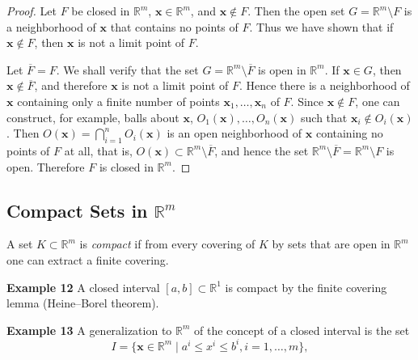 \begin{proof} Let $F$ be closed in $\mathbb{R}^m$, $\mathbf{x} \in \mathbb{R}^m$, and $\mathbf{x} \notin F$. Then the open set $G = \mathbb{R}^m \setminus F$
is a neighborhood of $\mathbf{x}$ that contains no points of $F$. Thus we have shown that if
$\mathbf{x} \notin F$, then $\mathbf{x}$ is not a limit point of $F$.

Let $\overline{F} = F$. We shall verify that the set $G = \mathbb{R}^m \setminus \overline{F}$ is open in $\mathbb{R}^m$. If $\mathbf{x} \in G$, then
$\mathbf{x} \notin \overline{F}$, and therefore $\mathbf{x}$ is not a limit point of $F$. Hence there is a neighborhood of
$\mathbf{x}$ containing only a finite number of points $\mathbf{x}_1, \ldots, \mathbf{x}_n$ of $F$. Since $\mathbf{x} \notin F$, one can
construct, for example, balls about $\mathbf{x}$, $O_1(\mathbf{x}), \ldots, O_n(\mathbf{x})$ such that $\mathbf{x}_i \notin O_i(\mathbf{x})$. Then
$O(\mathbf{x}) = \bigcap_{i=1}^n O_i(\mathbf{x})$ is an open neighborhood of $\mathbf{x}$ containing no points of $F$ at all,
that is, $O(\mathbf{x}) \subset \mathbb{R}^m \setminus \overline{F}$, and hence the set $\mathbb{R}^m \setminus \overline{F} = \mathbb{R}^m \setminus F$ is open. Therefore $F$ is
closed in $\mathbb{R}^m$.
\end{proof}

\subsection{Compact Sets in $\mathbb{R}^m$}
\begin{definition} \label{def:compact} A set $K \subset \mathbb{R}^m$ is \emph{compact} if from every covering of $K$ by sets that are
open in $\mathbb{R}^m$ one can extract a finite covering.
\end{definition}

\textbf{Example 12} A closed interval $[a, b] \subset \mathbb{R}^1$ is compact by the finite covering lemma
(Heine--Borel theorem).

\textbf{Example 13} A generalization to $\mathbb{R}^m$ of the concept of a closed interval is the set
$$
I = \{\mathbf{x} \in \mathbb{R}^m \mid a^i \le x^i \le b^i, i = 1, \ldots, m\},
$$